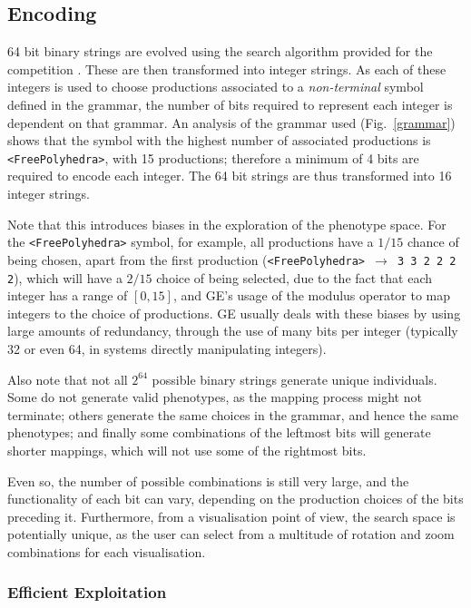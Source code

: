 \documentclass{article}
\begin{document}
\subsection{Encoding}

64 bit binary strings are evolved using the search algorithm provided for the competition \cite{browne2013a}.
These are then transformed into integer strings. As each of
these integers is used to choose productions associated to a
\textit{non-terminal} symbol defined in the grammar, the number of bits required to
represent each integer is dependent on that grammar. An analysis of the
grammar used (Fig.~\ref{grammar}) shows that the symbol with the highest number
of associated productions is \texttt{<FreePolyhedra>}, with 15 productions;
therefore a minimum of 4 bits are required to encode each integer. The 64 bit
strings are thus transformed into 16 integer strings.

Note that this introduces biases in the exploration of the phenotype space. For
the \texttt{<FreePolyhedra>} symbol, for example, all productions have a $1/15$
chance of being chosen, apart from the first production
(\texttt{<FreePolyhedra> $\rightarrow$ 3 3 2 2 2 2}), which will have a $2/15$
choice of being selected, due to the fact that each integer has a range of
$[0,15]$, and GE's usage of the modulus operator to map integers to the choice
of productions.  GE usually deals with these biases by using large amounts of
redundancy, through the use of many bits per integer (typically 32 or even 64,
in systems directly manipulating integers).

Also note that not all $2^{64}$ possible binary strings generate unique
individuals. Some do not generate valid phenotypes, as the mapping process
might not terminate; others generate the same choices in the grammar, and hence
the same phenotypes; and finally some combinations of the leftmost bits will
generate shorter mappings, which will not use some of the rightmost bits.

Even so, the number of possible combinations is still very large, and the
functionality of each bit can vary, depending on the production choices of the
bits preceding it. Furthermore, from a visualisation point of view, the search
space is potentially unique, as the user can select from a multitude of
rotation and zoom combinations for each visualisation.

\subsubsection{Efficient Exploitation}
\end{document}
